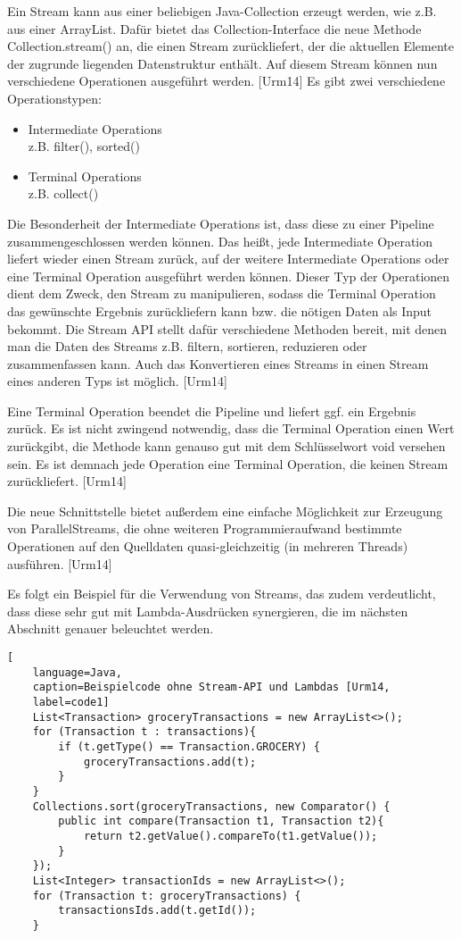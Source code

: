Ein Stream kann aus einer beliebigen Java-Collection erzeugt werden, wie z.B. aus einer ArrayList. Dafür bietet das Collection-Interface die neue Methode Collection.stream() an, die einen Stream zurückliefert, der die aktuellen Elemente der zugrunde liegenden Datenstruktur enthält. Auf diesem Stream können nun verschiedene Operationen ausgeführt werden. [Urm14] Es gibt zwei verschiedene Operationstypen:
\begin{itemize}
	\item Intermediate Operations \\z.B. filter(), sorted()
	\item Terminal Operations \\ z.B. collect()
\end{itemize}

Die Besonderheit der Intermediate Operations ist, dass diese zu einer Pipeline zusammengeschlossen werden können. Das heißt, jede Intermediate Operation liefert wieder einen Stream zurück, auf der weitere Intermediate Operations oder eine Terminal Operation ausgeführt werden können. Dieser Typ der Operationen dient dem Zweck, den Stream zu manipulieren, sodass die Terminal Operation das gewünschte Ergebnis zurückliefern kann bzw. die nötigen Daten als Input bekommt. Die Stream API stellt dafür verschiedene Methoden bereit, mit denen man die Daten des Streams z.B. filtern, sortieren, reduzieren oder zusammenfassen kann. Auch das Konvertieren eines Streams in einen Stream eines anderen Typs ist möglich. [Urm14]

Eine Terminal Operation beendet die Pipeline und liefert ggf. ein Ergebnis zurück. Es ist nicht zwingend notwendig, dass die Terminal Operation einen Wert zurückgibt, die Methode kann genauso gut mit dem Schlüsselwort void versehen sein. Es ist demnach jede Operation eine Terminal Operation, die keinen Stream zurückliefert. [Urm14]

Die neue Schnittstelle bietet außerdem eine einfache Möglichkeit zur Erzeugung von ParallelStreams, die ohne weiteren Programmieraufwand bestimmte Operationen auf den Quelldaten quasi-gleichzeitig (in mehreren Threads) ausführen. [Urm14]

Es folgt ein Beispiel für die Verwendung von Streams, das zudem verdeutlicht, dass diese sehr gut mit Lambda-Ausdrücken synergieren, die im nächsten Abschnitt genauer beleuchtet werden.

\begin{lstlisting}[
    language=Java,
    caption=Beispielcode ohne Stream-API und Lambdas [Urm14,
    label=code1]
	List<Transaction> groceryTransactions = new ArrayList<>();
	for (Transaction t : transactions){
		if (t.getType() == Transaction.GROCERY) {
			groceryTransactions.add(t);
  		}
	}
	Collections.sort(groceryTransactions, new Comparator() {
 		public int compare(Transaction t1, Transaction t2){
			return t2.getValue().compareTo(t1.getValue());
		}
	});
	List<Integer> transactionIds = new ArrayList<>();
	for (Transaction t: groceryTransactions) {
		transactionsIds.add(t.getId());
	}
\end{lstlisting}  

